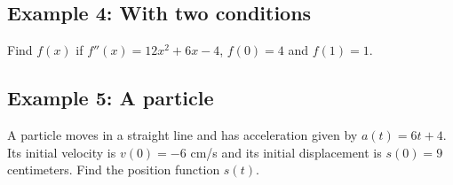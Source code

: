 \documentclass[10pt]{book}
\theoremstyle{definition}
\begin{document}
\subsection*{Example 4: With two conditions}
Find $f(x)$ if $f''(x)=12x^2+6x-4$, $f(0)=4$ and $f(1)=1$.\vspace{7cm}
\subsection*{Example 5: A particle}
A particle moves in a straight line and has acceleration given by $a(t)=6t+4$. Its initial velocity is $v(0)=-6$ cm/s and its initial displacement is $s(0)=9$ centimeters. Find the position function $s(t)$.
\end{document}
